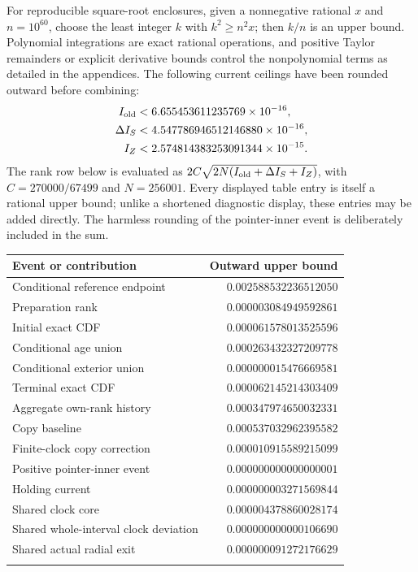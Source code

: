 \documentclass[11pt]{article}
\theoremstyle{definition}\newtheorem{definition}[theorem]{Definition}
\theoremstyle{remark}\newtheorem{remark}[theorem]{Remark}
\begin{document}
For reproducible square-root enclosures, given a nonnegative rational
$x$ and $n=10^{60}$, choose the least integer $k$ with $k^2\ge n^2x$;
then $k/n$ is an upper bound. Polynomial integrations are exact rational
operations, and positive Taylor remainders or explicit derivative bounds
control the nonpolynomial terms as detailed in the appendices. The
following current ceilings have been rounded outward before combining:
\[
\begin{split}
 I_{\rm old}&<6.655453611235769\times10^{-16},\\
 \Delta I_S&<4.547786946512146880\times10^{-16},\\
 I_Z&<2.574814383253091344\times10^{-15}.
\end{split}
\]
The rank row below is evaluated as $2C\sqrt{2N(I_{\rm old}+\Delta I_S+I_Z)}$,
with $C=270000/67499$ and $N=256001$. Every displayed table entry is
itself a rational upper bound; unlike a shortened diagnostic display,
these entries may be added directly. The harmless rounding of the
pointer-inner event is deliberately included in the sum.
\begin{center}\small
\begin{tabular}{@{}lr@{}}\toprule
Event or contribution & Outward upper bound\\\midrule
Conditional reference endpoint & $0.002588532236512050$\\
Preparation rank & $0.000003084949592861$\\
Initial exact CDF & $0.000061578013525596$\\
Conditional age union & $0.000263432327209778$\\
Conditional exterior union & $0.000000015476669581$\\
Terminal exact CDF & $0.000062145214303409$\\
Aggregate own-rank history & $0.000347974650032331$\\
Copy baseline & $0.000537032962395582$\\
Finite-clock copy correction & $0.000010915589215099$\\
Positive pointer-inner event & $0.000000000000000001$\\
Holding current & $0.000000003271569844$\\
Shared clock core & $0.000004378860028174$\\
Shared whole-interval clock deviation & $0.000000000000106690$\\
Shared actual radial exit & $0.000000091272176629$\\
\\\bottomrule
\end{tabular}
\end{center}
\end{document}
